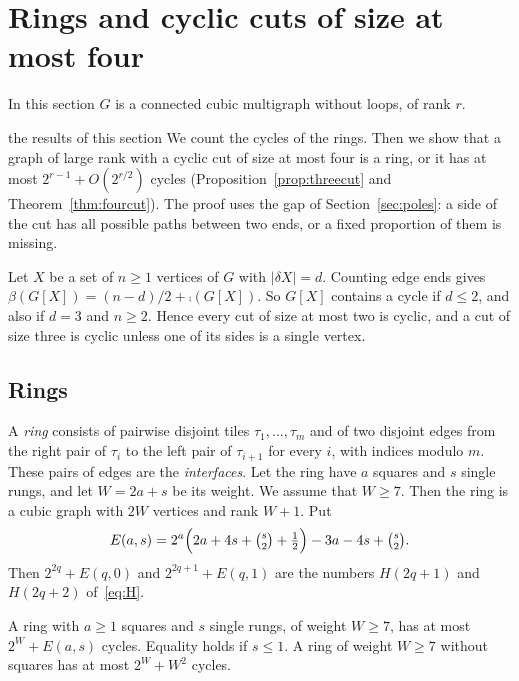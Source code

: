 \section{Rings and cyclic cuts of size at most four}\label{sec:cuts}

In this section $G$ is a connected cubic multigraph without loops, of rank $r$.

\begin{idea}{the results of this section}
We count the cycles of the rings. Then we show that a graph of large rank with a cyclic cut of
size at most four is a ring, or it has at most $2^{r-1}+O(2^{r/2})$ cycles
(Proposition~\ref{prop:threecut} and Theorem~\ref{thm:fourcut}). The proof uses the gap of
Section~\ref{sec:poles}: a side of the cut has all possible paths between two ends, or a fixed
proportion of them is missing.
\end{idea}

Let $X$ be a set of $n\ge1$ vertices of $G$ with $|\delta X|=d$. Counting edge ends gives
$\beta(G[X])=(n-d)/2+\comp(G[X])$. So $G[X]$ contains a cycle if $d\le2$, and also if $d=3$ and
$n\ge2$. Hence every cut of size at most two is cyclic, and a cut of size three is cyclic unless
one of its sides is a single vertex.

\subsection{Rings}\label{sec:rings}

A \emph{ring} consists of pairwise disjoint tiles $\tau_1,\dots,\tau_m$ and of two disjoint edges
from the right pair of $\tau_i$ to the left pair of $\tau_{i+1}$ for every $i$, with indices modulo
$m$. These pairs of edges are the \emph{interfaces}. Let the ring have $a$ squares and $s$ single
rungs, and let $W=2a+s$ be its weight. We assume that $W\ge7$. Then the ring is a cubic graph with
$2W$ vertices and rank $W+1$. Put
\[
  E(a,s)=2^{a}\Bigl(2a+4s+\tbinom s2+\tfrac12\Bigr)-3a-4s+\tbinom s2 .
\]
Then $2^{2q}+E(q,0)$ and $2^{2q+1}+E(q,1)$ are the numbers $H(2q+1)$ and $H(2q+2)$
of~\eqref{eq:H}.

\begin{proposition}[Rings]\label{prop:rings}
A ring with $a\ge1$ squares and $s$ single rungs, of weight $W\ge7$, has at most $2^{W}+E(a,s)$
cycles. Equality holds if $s\le1$. A ring of weight
$W\ge7$ without squares has at most $2^{W}+W^{2}$ cycles.
\end{proposition}

